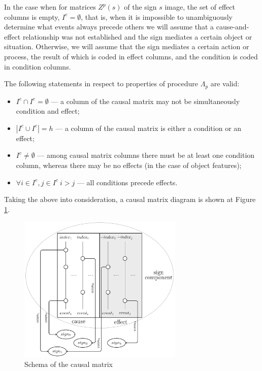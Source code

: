 \documentclass[review]{elsarticle}
\begin{document}
In the case when for matrices $Z^p(s)$ of the sign $s$ image, the set of effect columns is empty, $I^e=\emptyset$, that is, when it is impossible to unambiguously determine what events always precede others we will assume that a cause-and-effect relationship was not established and the sign mediates a certain object or situation. Otherwise, we will assume that the sign mediates a certain action or process, the result of which is coded in effect columns, and the condition is coded in condition columns. 

The following statements in respect to properties of procedure $\Lambda_p$ are valid:
\begin{itemize}
	\item $I^c\cap I^e=\emptyset$ --- a column of the causal matrix may not be simultaneously condition and effect;
	\item $|I^c\cup I^e|=h$ --- a column of the causal matrix is either a condition or an effect;
	\item $I^c\not = \emptyset$ --- among causal matrix columns there must be at least one condition column, whereas there may be no effects (in the case of object features);
	\item $\forall i\in I^e, j\in I^c\ i>j$ --- all conditions precede effects.
\end{itemize}
Taking the above into consideration, a causal matrix diagram is shown at Figure \ref{fig:caus_matr}.

\begin{figure}
	\centering
	\includegraphics[width=0.7\textwidth]{caus_matr}
	\caption{Schema of the causal matrix}	
	\label{fig:caus_matr}	
\end{figure}
\end{document}
